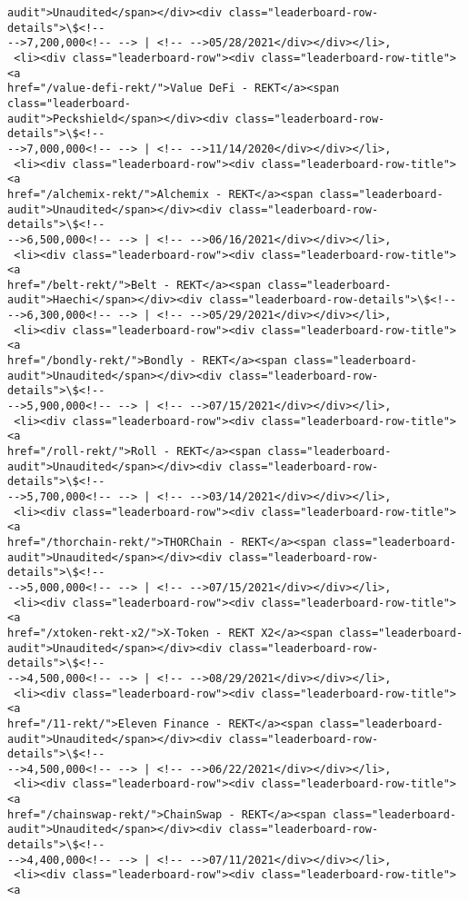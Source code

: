 \documentclass[11pt]{article}
\begin{document}
\begin{tcolorbox}[breakable, size=fbox, boxrule=.5pt, pad at break*=1mm, opacityfill=0]
\begin{Verbatim}[commandchars=\\\{\}]
audit">Unaudited</span></div><div class="leaderboard-row-details">\$<!--
-->7,200,000<!-- --> | <!-- -->05/28/2021</div></div></li>,
 <li><div class="leaderboard-row"><div class="leaderboard-row-title"><a
href="/value-defi-rekt/">Value DeFi - REKT</a><span class="leaderboard-
audit">Peckshield</span></div><div class="leaderboard-row-details">\$<!--
-->7,000,000<!-- --> | <!-- -->11/14/2020</div></div></li>,
 <li><div class="leaderboard-row"><div class="leaderboard-row-title"><a
href="/alchemix-rekt/">Alchemix - REKT</a><span class="leaderboard-
audit">Unaudited</span></div><div class="leaderboard-row-details">\$<!--
-->6,500,000<!-- --> | <!-- -->06/16/2021</div></div></li>,
 <li><div class="leaderboard-row"><div class="leaderboard-row-title"><a
href="/belt-rekt/">Belt - REKT</a><span class="leaderboard-
audit">Haechi</span></div><div class="leaderboard-row-details">\$<!--
-->6,300,000<!-- --> | <!-- -->05/29/2021</div></div></li>,
 <li><div class="leaderboard-row"><div class="leaderboard-row-title"><a
href="/bondly-rekt/">Bondly - REKT</a><span class="leaderboard-
audit">Unaudited</span></div><div class="leaderboard-row-details">\$<!--
-->5,900,000<!-- --> | <!-- -->07/15/2021</div></div></li>,
 <li><div class="leaderboard-row"><div class="leaderboard-row-title"><a
href="/roll-rekt/">Roll - REKT</a><span class="leaderboard-
audit">Unaudited</span></div><div class="leaderboard-row-details">\$<!--
-->5,700,000<!-- --> | <!-- -->03/14/2021</div></div></li>,
 <li><div class="leaderboard-row"><div class="leaderboard-row-title"><a
href="/thorchain-rekt/">THORChain - REKT</a><span class="leaderboard-
audit">Unaudited</span></div><div class="leaderboard-row-details">\$<!--
-->5,000,000<!-- --> | <!-- -->07/15/2021</div></div></li>,
 <li><div class="leaderboard-row"><div class="leaderboard-row-title"><a
href="/xtoken-rekt-x2/">X-Token - REKT X2</a><span class="leaderboard-
audit">Unaudited</span></div><div class="leaderboard-row-details">\$<!--
-->4,500,000<!-- --> | <!-- -->08/29/2021</div></div></li>,
 <li><div class="leaderboard-row"><div class="leaderboard-row-title"><a
href="/11-rekt/">Eleven Finance - REKT</a><span class="leaderboard-
audit">Unaudited</span></div><div class="leaderboard-row-details">\$<!--
-->4,500,000<!-- --> | <!-- -->06/22/2021</div></div></li>,
 <li><div class="leaderboard-row"><div class="leaderboard-row-title"><a
href="/chainswap-rekt/">ChainSwap - REKT</a><span class="leaderboard-
audit">Unaudited</span></div><div class="leaderboard-row-details">\$<!--
-->4,400,000<!-- --> | <!-- -->07/11/2021</div></div></li>,
 <li><div class="leaderboard-row"><div class="leaderboard-row-title"><a

\end{Verbatim}
\end{tcolorbox}
\end{document}
